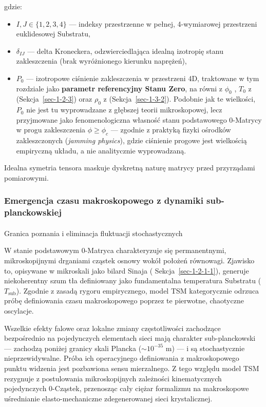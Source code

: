 \documentclass[
  polish,
  letterpaper,
  DIV=11,
  numbers=noendperiod,
  oneside]{scrartcl}
\makeatletter
\let\oldparagraph\paragraph
\renewcommand{\paragraph}{
    \@ifstar
      \xxxParagraphStar
      \xxxParagraphNoStar
  }
\newcommand{\xxxParagraphStar}[1]{\oldparagraph*{#1}\mbox{}}
\newcommand{\xxxParagraphNoStar}[1]{\oldparagraph{#1}\mbox{}}
\providecommand{\tightlist}{%
  \setlength{\itemsep}{0pt}\setlength{\parskip}{0pt}}
\makeatother
\begin{document}
gdzie:

\begin{itemize}
\tightlist
\item
  \(I,J \in \{1,2,3,4\}\) --- indeksy przestrzenne w pełnej,
  4-wymiarowej przestrzeni euklidesowej Substratu,
\item
  \(\delta_{IJ}\) --- delta Kroneckera, odzwierciedlająca idealną
  izotropię stanu zakleszczenia (brak wyróżnionego kierunku naprężeń),
\item
  \(P_0\) --- izotropowe ciśnienie zakleszczenia w przestrzeni 4D,
  traktowane w tym rozdziale jako \textbf{parametr referencyjny Stanu
  Zero}, na równi z \(\phi_0\) , \(T_0\) z (Sekcja~\ref{sec-1-2-3}) oraz
  \(\rho_0\) z (Sekcja~\ref{sec-1-3-2}). Podobnie jak te wielkości,
  \(P_0\) nie jest tu wyprowadzane z głębszej teorii mikroskopowej, lecz
  przyjmowane jako fenomenologiczna własność stanu podstawowego
  0-Matrycy w progu zakleszczenia \(\phi\ge\phi_c\) --- zgodnie z
  praktyką fizyki ośrodków zakleszczonych (\emph{jamming physics}),
  gdzie ciśnienie progowe jest wielkością empiryczną układu, a nie
  analitycznie wyprowadzaną.
\end{itemize}

Idealna symetria tensora maskuje dyskretną naturę matrycy przed
przyrządami pomiarowymi.

\subsubsection{Emergencja czasu makroskopowego z dynamiki
sub-planckowskiej}\label{sec-1-2a}

\paragraph{Granica poznania i eliminacja fluktuacji
stochastycznych}\label{sec-1-2a-1}

W stanie podstawowym 0-Matryca charakteryzuje się permanentnymi,
mikroskopijnymi drganiami cząstek osnowy wokół położeń równowagi.
Zjawisko to, opisywane w mikroskali jako bilard Sinaja (
Sekcja~\ref{sec-1-2-1-1}), generuje niekoherentny szum tła definiowany
jako fundamentalna temperatura Substratu (\(T_{\text{sub}}\)). Zgodnie z
zasadą rygoru empirycznego, model TSM kategorycznie odrzuca próbę
definiowania czasu makroskopowego poprzez te pierwotne, chaotyczne
oscylacje.

Wszelkie efekty falowe oraz lokalne zmiany częstotliwości zachodzące
bezpośrednio na pojedynczych elementach sieci mają charakter
sub-planckowski --- zachodzą poniżej granicy skali Plancka
(\(\sim 10^{-35}\) m) --- i są stochastycznie nieprzewidywalne. Próba
ich operacyjnego definiowania z makroskopowego punktu widzenia jest
pozbawiona sensu mierzalnego. Z tego względu model TSM rezygnuje z
postulowania mikroskopijnych zależności kinematycznych pojedynczych
0-Cząstek, przenosząc cały ciężar formalizmu na makroskopowe uśrednianie
elasto-mechaniczne zdegenerowanej sieci krystalicznej.
\end{document}
